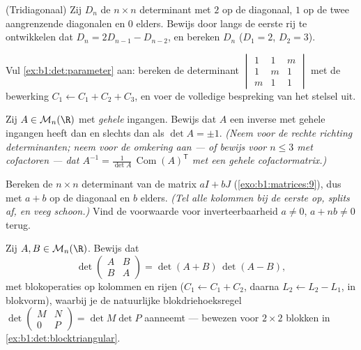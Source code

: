 \begin{exercise}[$\star\star$]\label{exo:b1:det:6}
(Tridiagonaal) Zij $D_n$ de $n \times n$ determinant met $2$ op de
diagonaal, $1$ op de twee aangrenzende diagonalen en $0$ elders.
Bewijs door langs de eerste rij te ontwikkelen dat $D_n = 2D_{n-1}
- D_{n-2}$, en bereken $D_n$ ($D_1 = 2$, $D_2 = 3$).
\end{exercise}

\begin{exercise}[$\star\star$]\label{exo:b1:det:7}
Vul \cref{ex:b1:det:parameter} aan: bereken de determinant
$\begin{vmatrix} 1 & 1 & m\\ 1 & m & 1\\ m & 1 & 1\end{vmatrix}$
met de bewerking $C_1 \leftarrow C_1 + C_2 + C_3$, en voer de
volledige bespreking van het stelsel uit.
\end{exercise}

\begin{exercise}[$\star\star$]\label{exo:b1:det:8}
Zij $A \in \mathcal{M}_n(\R)$ met \emph{gehele} ingangen. Bewijs
dat $A$ een inverse met gehele ingangen heeft dan en slechts dan als
$\det A = \pm 1$. \emph{(Neem voor de rechte richting
determinanten; neem voor de omkering aan --- of bewijs voor $n \leq
3$ met cofactoren --- dat $A^{-1} = \frac{1}{\det A}\,
\operatorname{Com}(A)^{\mathsf T}$ met een gehele cofactormatrix.)}
\end{exercise}

\begin{exercise}[$\star\star\star$]\label{exo:b1:det:9}
Bereken de $n \times n$ determinant van de matrix $aI + bJ$
(\cref{exo:b1:matrices:9}), dus met $a + b$ op de diagonaal en $b$
elders. \emph{(Tel alle kolommen bij de eerste op, splits af, en
veeg schoon.)} Vind de voorwaarde voor inverteerbaarheid $a \neq
0$, $a + nb \neq 0$ terug.
\end{exercise}

\begin{exercise}[$\star\star\star$]\label{exo:b1:det:10}
Zij $A, B \in \mathcal{M}_n(\R)$. Bewijs dat
\[
\det\begin{pmatrix} A & B\\ B & A \end{pmatrix}
= \det(A + B)\,\det(A - B),
\]
met blokoperaties op kolommen en rijen ($C_1 \leftarrow C_1 + C_2$,
daarna $L_2 \leftarrow L_2 - L_1$, in blokvorm), waarbij je de
natuurlijke blokdriehoeksregel $\det\begin{pmatrix} M & N\\ 0 &
P\end{pmatrix} = \det M \det P$ aanneemt --- bewezen voor $2 \times
2$ blokken in \cref{ex:b1:det:blocktriangular}.
\end{exercise}


